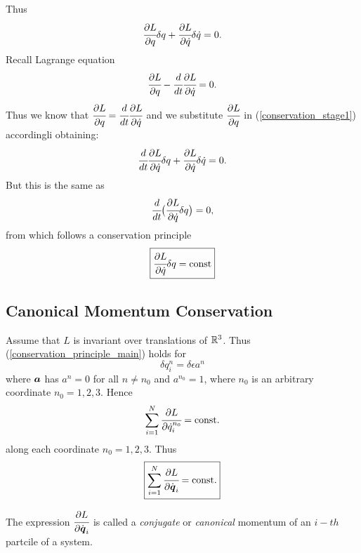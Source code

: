 \documentclass[main.tex]{subfiles}
\begin{document}
Thus
\begin{equation}
\label{conservation_stage1}
\cfrac{\partial L}{\partial q}\delta q + \cfrac{\partial L}{\partial \dot{q}}\delta \dot{q} = 0. 
\end{equation}
Recall Lagrange equation
\begin{equation}
\label{lagrange_equation3}
\cfrac{\partial L}{\partial q} - \cfrac{d}{dt}\cfrac{\partial L}{\partial \dot{q}} = 0.
\end{equation}
Thus we know that $\cfrac{\partial L}{\partial q} = \cfrac{d}{dt}\cfrac{\partial L}{\partial \dot{q}}$ and we substitute $\cfrac{\partial L}{\partial q}$ in (\ref{conservation_stage1}) accordingli obtaining:
\begin{equation}
\cfrac{d}{dt}\cfrac{\partial L}{\partial \dot{q}}\delta q + \cfrac{\partial L}{\partial \dot{q}}\delta \dot{q} = 0. 
\end{equation}
But this is the same as
\begin{equation}
\cfrac{d}{dt}\big( \cfrac{\partial L}{\partial \dot{q}}\delta q \big) = 0,
\end{equation}
from which follows a conservation principle
\begin{equation}
\label{conservation_principle_main}
\boxed{
 \cfrac{\partial L}{\partial \dot{q}}\delta q = \text{const}
 }
\end{equation}
\subsection{Canonical Momentum Conservation}
Assume that $L$ is invariant over translations of $\mathbb{R}^3$. Thus (\ref{conservation_principle_main}) holds for
\begin{equation}
\delta q^{n}_i = \delta\epsilon a^{n}
\end{equation}
where $\boldsymbol{a}$ has $a^n = 0$ for all $n\not=n_0$ and $a^{n_0} = 1$, where $n_0$ is an arbitrary coordinate $n_0 = 1, 2, 3$.
Hence
\begin{equation}
\sum_{i=1}^{N} \cfrac{\partial L}{\partial \dot{q}^{n_0}_i} = \text{const}.
\end{equation}
along each coordinate $n_0 = 1, 2, 3$. Thus
\begin{equation}
\boxed{
\sum_{i=1}^{N} \cfrac{\partial L}{\partial \dot{\boldsymbol{q}}_i} = \text{const}.
}
\end{equation}

The expression $\cfrac{\partial L}{\partial \dot{\boldsymbol{q}}_i}$ is called a \textit{conjugate} or \textit{canonical} momentum of an $i-th$ partcile of a system.
\end{document}
